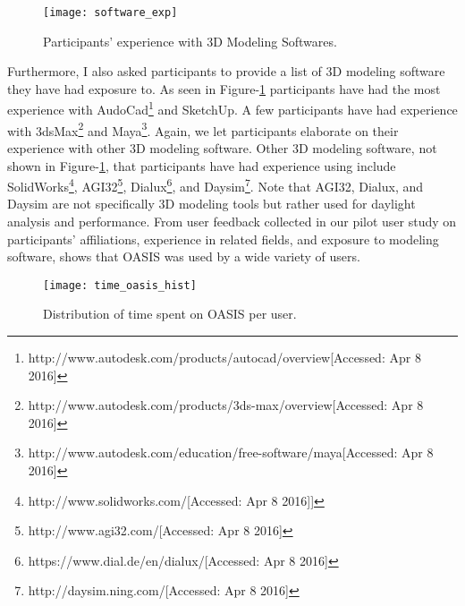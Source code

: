 \begin{figure}[!ht]
	\centering
	\caption{Participants' experience with 3D Modeling Softwares.}
	\label{fig:software_exp}
	\texttt{[image: software\_exp]}
\end{figure}

Furthermore, I also asked participants to provide a list of 3D modeling software they have had exposure to.
As seen in Figure-\ref{fig:software_exp} participants have had the most experience with AudoCad\footnote{http://www.autodesk.com/products/autocad/overview[Accessed: Apr 8 2016]} and SketchUp. 
A few participants have had experience with 3dsMax\footnote{http://www.autodesk.com/products/3ds-max/overview[Accessed: Apr 8 2016]} and Maya\footnote{http://www.autodesk.com/education/free-software/maya[Accessed: Apr 8 2016]}.
Again, we let participants elaborate on their experience with other 3D modeling software. 
Other 3D modeling software, not shown in Figure-\ref{fig:software_exp}, that participants have had experience using include SolidWorks\footnote{http://www.solidworks.com/[Accessed: Apr 8 2016]]}, AGI32\footnote{http://www.agi32.com/[Accessed: Apr 8 2016]}, Dialux\footnote{https://www.dial.de/en/dialux/[Accessed: Apr 8 2016]}, and Daysim\footnote{http://daysim.ning.com/[Accessed: Apr 8 2016]}.
Note that AGI32, Dialux, and Daysim are not specifically 3D modeling tools but rather used for daylight analysis and performance.
From user feedback collected in our pilot user study on participants' affiliations, experience in related fields, and exposure to modeling software, shows that OASIS was used by a wide variety of users.

\begin{figure}[!ht]
	\centering
	\caption{Distribution of time spent on OASIS per user.}
	\label{fig:time_oasis_hist}
	\texttt{[image: time\_oasis\_hist]}
\end{figure}

